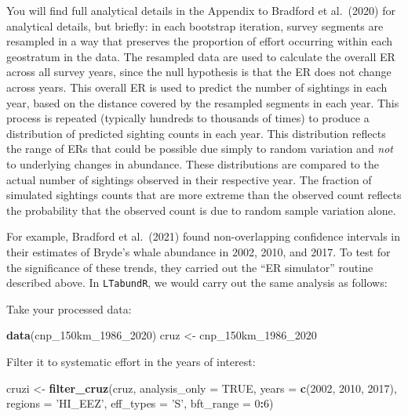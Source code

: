 \documentclass[
]{book}
\newenvironment{Shaded}{\begin{snugshade}}{\end{snugshade}}
\newcommand{\DataTypeTok}[1]{\textcolor[rgb]{0.13,0.29,0.53}{#1}}
\newcommand{\DecValTok}[1]{\textcolor[rgb]{0.00,0.00,0.81}{#1}}
\newcommand{\KeywordTok}[1]{\textcolor[rgb]{0.13,0.29,0.53}{\textbf{#1}}}
\newcommand{\NormalTok}[1]{#1}
\newcommand{\OperatorTok}[1]{\textcolor[rgb]{0.81,0.36,0.00}{\textbf{#1}}}
\newcommand{\OtherTok}[1]{\textcolor[rgb]{0.56,0.35,0.01}{#1}}
\newcommand{\StringTok}[1]{\textcolor[rgb]{0.31,0.60,0.02}{#1}}
\begin{document}
You will find full analytical details in the Appendix to Bradford et al.~(2020) for analytical details, but briefly: in each bootstrap iteration, survey segments are resampled in a way that preserves the proportion of effort occurring within each geostratum in the data. The resampled data are used to calculate the overall ER across all survey years, since the null hypothesis is that the ER does not change across years. This overall ER is used to predict the number of sightings in each year, based on the distance covered by the resampled segments in each year. This process is repeated (typically hundreds to thousands of times) to produce a distribution of predicted sighting counts in each year. This distribution reflects the range of ERs that could be possible due simply to random variation and \emph{not} to underlying changes in abundance. These distributions are compared to the actual number of sightings observed in their respective year. The fraction of simulated sightings counts that are more extreme than the observed count reflects the probability that the observed count is due to random sample variation alone.

For example, Bradford et al.~(2021) found non-overlapping confidence intervals in their estimates of Bryde's whale abundance in 2002, 2010, and 2017. To test for the significance of these trends, they carried out the ``ER simulator'' routine described above. In \texttt{LTabundR}, we would carry out the same analysis as follows:

Take your processed data:

\begin{Shaded}
\begin{Highlighting}[]
\KeywordTok{data}\NormalTok{(cnp_150km_}\DecValTok{1986}\NormalTok{_}\DecValTok{2020}\NormalTok{)}
\NormalTok{cruz <-}\StringTok{ }\NormalTok{cnp_150km_}\DecValTok{1986}\NormalTok{_}\DecValTok{2020}
\end{Highlighting}
\end{Shaded}

Filter it to systematic effort in the years of interest:

\begin{Shaded}
\begin{Highlighting}[]
\NormalTok{cruzi <-}\StringTok{ }
\StringTok{  }\KeywordTok{filter_cruz}\NormalTok{(cruz,}
              \DataTypeTok{analysis_only =} \OtherTok{TRUE}\NormalTok{,}
              \DataTypeTok{years =} \KeywordTok{c}\NormalTok{(}\DecValTok{2002}\NormalTok{, }\DecValTok{2010}\NormalTok{, }\DecValTok{2017}\NormalTok{),}
              \DataTypeTok{regions =} \StringTok{'HI_EEZ'}\NormalTok{,}
              \DataTypeTok{eff_types =} \StringTok{'S'}\NormalTok{,}
              \DataTypeTok{bft_range =} \DecValTok{0}\OperatorTok{:}\DecValTok{6}\NormalTok{)}
\end{Highlighting}
\end{Shaded}
\end{document}
